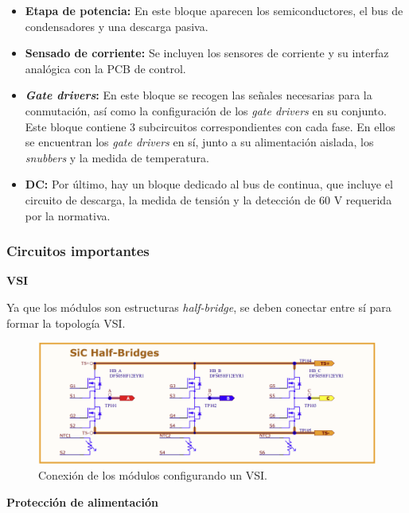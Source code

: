 \begin{itemize}
	
	\item \textbf{Etapa de potencia:} En este bloque aparecen los semiconductores, el bus de condensadores y una descarga pasiva.
	
	\item \textbf{Sensado de corriente:} Se incluyen los sensores de corriente y su interfaz analógica con la PCB de control.
			
	\item \textbf{\textit{Gate drivers}:} En este bloque se recogen las señales necesarias para la conmutación, así como la configuración de los \textit{gate drivers} en su conjunto. Este bloque contiene 3 subcircuitos correspondientes con cada fase. En ellos se encuentran los \textit{gate drivers} en sí, junto a su alimentación aislada, los \textit{snubbers} y la medida de temperatura.
		
	\item \textbf{DC:} Por último, hay un bloque dedicado al bus de continua, que incluye el circuito de descarga, la medida de tensión y la detección de 60 V requerida por la normativa.
\end{itemize}

\subsubsection{Circuitos importantes}

\textbf{VSI}

Ya que los módulos son estructuras \textit{half-bridge}, se deben conectar entre sí para formar la topología VSI.
\begin{figure}[H]
	\centering
	\includegraphics[width=0.7\linewidth]{fig/VSI-shc}
	\caption{Conexión de los módulos configurando un VSI.}
\end{figure}

\textbf{Protección de alimentación}

